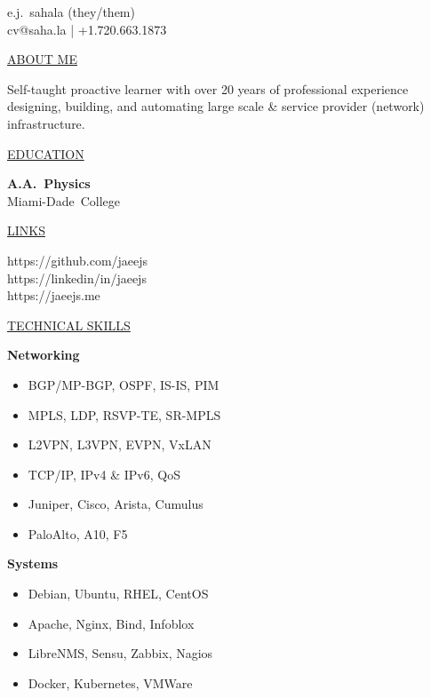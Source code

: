 \documentclass[11pt]{article}
\newcommand{\resumetitle}[3]{
    \AddToShipoutPictureBG{
        \AtPageUpperLeft{
        \raisebox{-0.09\paperheight}{
            \color{black!85}\rule{2\paperwidth}{\paperheight}}
        }}
    \begin{Center}
        \begingroup
        \titlethin{}
        \color{black!10}\Huge{#1}
        \titlethick{}
        \color{black!5}\Huge{#2} \\
        \vspace{2mm}
        \textrm{\color{black!15}\Large{#3}}
        \endgroup
    \end{Center}
    \vspace{7mm}
}
\newcommand{\betteruline}[1]{
    \uline{#1}
}
\newcommand{\sectiontitle}[1]{
    \begingroup
        \titlebold{}
        \betteruline{\Large\uppercase{#1}  }
        \vspace{1.7mm}
    \endgroup
}
\newcommand{\sectioncontent}[1]{
    \begingroup
        \begin{FlushLeft}
        \vspace{-3mm}
        \sffamily\small#1
        \end{FlushLeft}
    \endgroup
    \vspace{2mm}
}
\newcommand{\spacevv}{
    \vspace{2mm}
}
\begin{document}
    \resumetitle{}{e.j.\ sahala (they/them)} {
        cv@saha.la |
        +1.720.663.1873
    }

    \setlength{\columnsep}{7mm}
    \begin{paracol}{2}

    \sectiontitle{about me}
    \sectioncontent{
        Self-taught proactive learner with over 20 years of professional experience designing, building, and automating
        large scale \& service provider (network) infrastructure.
    }

    \sectiontitle{education}
    \sectioncontent{
        \textbf{A.A.\ Physics} \\
        Miami-Dade\ College\\
    }

    \sectiontitle{links}
    \sectioncontent{
        \hspace{2mm} {https://github.com/jaeejs} \\
        \faIcon{linkedin-in}\hspace{2.1mm} {https://linkedin/in/jaeejs} \\
        \faIcon{link}\hspace{1.8mm} {https://jaeejs.me}
    }

    \sectiontitle{technical skills}
    \sectioncontent{
        \textbf{Networking} \\
        \begin{itemize}
            \item BGP/MP-BGP, OSPF, IS-IS, PIM
            \item MPLS, LDP, RSVP-TE, SR-MPLS
            \item L2VPN, L3VPN, EVPN, VxLAN
            \item TCP/IP, IPv4 \& IPv6, QoS
            \item Juniper, Cisco, Arista, Cumulus
            \item PaloAlto, A10, F5
        \end{itemize}
        \spacevv{}

        \textbf{Systems} \\
        \begin{itemize}
            \item Debian, Ubuntu, RHEL, CentOS
            \item Apache, Nginx, Bind, Infoblox
            \item LibreNMS, Sensu, Zabbix, Nagios
            \item Docker, Kubernetes, VMWare
        \end{itemize}
        \spacevv{}

}
\end{paracol}
\end{document}
